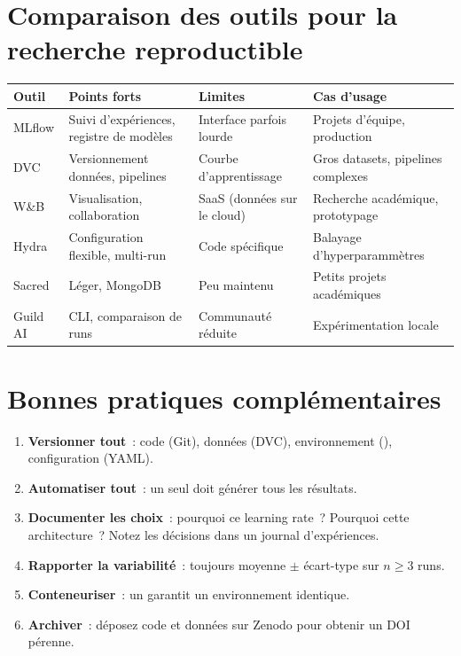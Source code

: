 \section{Comparaison des outils pour la recherche reproductible}
\label{sec:tools-repro}

\begin{center}
\begin{tabular}{@{}lp{3cm}p{3cm}p{3.5cm}@{}}
\toprule
\textbf{Outil} & \textbf{Points forts} & \textbf{Limites} &
  \textbf{Cas d'usage} \\
\midrule
MLflow & Suivi d'exp\'eriences, registre de mod\`eles & Interface parfois
  lourde & Projets d'\'equipe, production \\
DVC & Versionnement donn\'ees, pipelines & Courbe d'apprentissage &
  Gros datasets, pipelines complexes \\
W\&B & Visualisation, collaboration & SaaS (donn\'ees sur le cloud) &
  Recherche acad\'emique, prototypage \\
Hydra & Configuration flexible, multi-run & Code sp\'ecifique &
  Balayage d'hyperparamm\`etres \\
Sacred & L\'eger, MongoDB & Peu maintenu & Petits projets acad\'emiques \\
Guild AI & CLI, comparaison de runs & Communaut\'e r\'eduite &
  Exp\'erimentation locale \\
\bottomrule
\end{tabular}
\end{center}

\section{Bonnes pratiques compl\'ementaires}
\label{sec:bonnes-pratiques-repro}

\begin{bonnepratique}[title=\textbf{R\`egles d'or de la reproductibilit\'e}]
\begin{enumerate}
  \item \textbf{Versionner tout}~: code (Git), donn\'ees (DVC), environnement
    (), configuration (YAML).
  \item \textbf{Automatiser tout}~: un seul  doit
    g\'en\'erer tous les r\'esultats.
  \item \textbf{Documenter les choix}~: pourquoi ce learning rate~? Pourquoi
    cette architecture~? Notez les d\'ecisions dans un journal d'exp\'eriences.
  \item \textbf{Rapporter la variabilit\'e}~: toujours moyenne $\pm$
    \'ecart-type sur $n \geq 3$ runs.
  \item \textbf{Conteneuriser}~: un  garantit un
    environnement identique.
  \item \textbf{Archiver}~: d\'eposez code et donn\'ees sur Zenodo pour
    obtenir un DOI p\'erenne.
\end{enumerate}
\end{bonnepratique}

